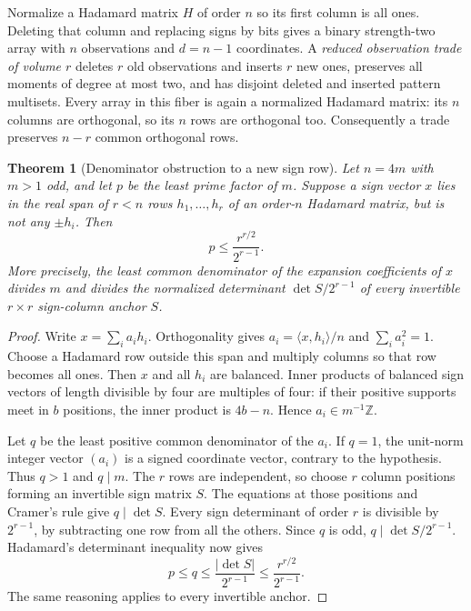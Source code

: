 \documentclass[11pt]{article}
\newtheorem{theorem}{Theorem}[section]
\begin{document}
Normalize a Hadamard matrix $H$ of order $n$ so its first column is all
ones. Deleting that column and replacing signs by bits gives a binary
strength-two array with $n$ observations and $d=n-1$ coordinates.
A \emph{reduced observation trade of volume $r$} deletes $r$ old
observations and inserts $r$ new ones, preserves all moments of degree at
most two, and has disjoint deleted and inserted pattern multisets.
Every array in this fiber is again a normalized Hadamard matrix: its
$n$ columns are orthogonal, so its $n$ rows are orthogonal too.
Consequently a trade preserves $n-r$ common orthogonal rows.

\begin{theorem}[Denominator obstruction to a new sign row]\label{trd:denom}
Let $n=4m$ with $m>1$ odd, and let $p$ be the least prime factor of $m$.
Suppose a sign vector $x$ lies in the real span of $r<n$ rows
$h_1,\ldots,h_r$ of an order-$n$ Hadamard matrix, but is not any
$\pm h_i$. Then
\begin{equation}\label{trd:bound}
 p\le\frac{r^{r/2}}{2^{r-1}}.
\end{equation}
More precisely, the least common denominator of the expansion
coefficients of $x$ divides $m$ and divides the normalized determinant
$\det S/2^{r-1}$ of every invertible $r\times r$ sign-column anchor $S$.
\end{theorem}
\begin{proof}
Write $x=\sum_i a_i h_i$. Orthogonality gives
$a_i=\langle x,h_i\rangle/n$ and $\sum_i a_i^2=1$.
Choose a Hadamard row outside this span and multiply columns so that row
becomes all ones. Then $x$ and all $h_i$ are balanced. Inner products of
balanced sign vectors of length divisible by four are multiples of four:
if their positive supports meet in $b$ positions, the inner product is
$4b-n$. Hence $a_i\in m^{-1}\mathbb Z$.

Let $q$ be the least positive common denominator of the $a_i$.
If $q=1$, the unit-norm integer vector $(a_i)$ is a signed coordinate
vector, contrary to the hypothesis. Thus $q>1$ and $q\mid m$.
The $r$ rows are independent, so choose $r$ column positions forming an
invertible sign matrix $S$. The equations at those positions and Cramer's
rule give $q\mid\det S$. Every sign determinant of order $r$ is divisible
by $2^{r-1}$, by subtracting one row from all the others. Since $q$ is
odd, $q\mid\det S/2^{r-1}$. Hadamard's determinant inequality now gives
\[
 p\le q\le\frac{|\det S|}{2^{r-1}}
 \le\frac{r^{r/2}}{2^{r-1}}.
\]
The same reasoning applies to every invertible anchor.
\end{proof}
\end{document}
